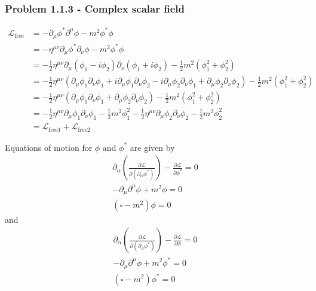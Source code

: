 \documentclass[10pt,a4paper]{article}
\theoremstyle{definition}
\begin{document}
\subsubsection{Problem 1.1.3 - Complex scalar field }
\begin{align}
    \mathcal{L}_\text{free}&=-\partial_\mu\phi^*\partial^\mu\phi-m^2\phi^*\phi\\
    &=-\eta^{\mu\nu}\partial_\mu\phi^*\partial_\nu\phi-m^2\phi^*\phi\\
    &=-\frac{1}{2}\eta^{\mu\nu}\partial_\mu(\phi_1-i\phi_2)\partial_\nu(\phi_1+i\phi_2)-\frac{1}{2}m^2(\phi_1^2+\phi_2^2)\\
    &=-\frac{1}{2}\eta^{\mu\nu}\left(
    \partial_\mu\phi_1\partial_\nu\phi_1
    +i\partial_\mu\phi_1\partial_\nu\phi_2
    -i\partial_\mu\phi_2\partial_\nu\phi_1
    +\partial_\mu\phi_2\partial_\nu\phi_2
    \right)-\frac{1}{2}m^2(\phi_1^2+\phi_2^2)\\
    &=-\frac{1}{2}\eta^{\mu\nu}\left(\partial_\mu\phi_1\partial_\nu\phi_1+\partial_\mu\phi_2\partial_\nu\phi_2\right)-\frac{1}{2}m^2(\phi_1^2+\phi_2^2)\\
    &=-\frac{1}{2}\eta^{\mu\nu}\partial_\mu\phi_1\partial_\nu\phi_1-\frac{1}{2}m^2\phi_1^2
    -\frac{1}{2}\eta^{\mu\nu}\partial_\mu\phi_2\partial_\nu\phi_2-\frac{1}{2}m^2\phi_2^2\\
    &=\mathcal{L}_\text{free1}+\mathcal{L}_\text{free2}
\end{align}

Equations of motion for $\phi$ and $\phi^*$ are given by
\begin{align}
    \partial_\alpha\left(\frac{\partial\mathcal{L}}{\partial(\partial_\alpha\phi^*)}\right)-\frac{\partial\mathcal{L}}{\partial\phi^*}=0\\
    -\partial_\mu\partial^\mu\phi+m^2\phi=0\\
    (\square-m^2)\phi=0
\end{align}
and
\begin{align}
    \partial_\alpha\left(\frac{\partial\mathcal{L}}{\partial(\partial_\alpha\phi^*)}\right)-\frac{\partial\mathcal{L}}{\partial\phi}=0\\
    -\partial_\mu\partial^\mu\phi+m^2\phi^*=0\\
    (\square-m^2)\phi^*=0
\end{align}
\end{document}
